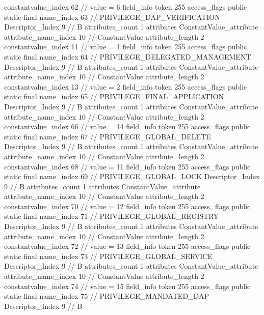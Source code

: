 {{{{{{{					constantvalue_index	62		// value = 6
				}
				}
			}
			field_info {
				token	255
				access_flags	public static final
				name_index	63		// PRIVILEGE_DAP_VERIFICATION
				Descriptor_Index	9		// B
				attributes_count	1
				attributes {
				ConstantValue_attribute {
					attribute_name_index	10		// ConstantValue
					attribute_length	2
					constantvalue_index	11		// value = 1
				}
				}
			}
			field_info {
				token	255
				access_flags	public static final
				name_index	64		// PRIVILEGE_DELEGATED_MANAGEMENT
				Descriptor_Index	9		// B
				attributes_count	1
				attributes {
				ConstantValue_attribute {
					attribute_name_index	10		// ConstantValue
					attribute_length	2
					constantvalue_index	13		// value = 2
				}
				}
			}
			field_info {
				token	255
				access_flags	public static final
				name_index	65		// PRIVILEGE_FINAL_APPLICATION
				Descriptor_Index	9		// B
				attributes_count	1
				attributes {
				ConstantValue_attribute {
					attribute_name_index	10		// ConstantValue
					attribute_length	2
					constantvalue_index	66		// value = 14
				}
				}
			}
			field_info {
				token	255
				access_flags	public static final
				name_index	67		// PRIVILEGE_GLOBAL_DELETE
				Descriptor_Index	9		// B
				attributes_count	1
				attributes {
				ConstantValue_attribute {
					attribute_name_index	10		// ConstantValue
					attribute_length	2
					constantvalue_index	68		// value = 11
				}
				}
			}
			field_info {
				token	255
				access_flags	public static final
				name_index	69		// PRIVILEGE_GLOBAL_LOCK
				Descriptor_Index	9		// B
				attributes_count	1
				attributes {
				ConstantValue_attribute {
					attribute_name_index	10		// ConstantValue
					attribute_length	2
					constantvalue_index	70		// value = 12
				}
				}
			}
			field_info {
				token	255
				access_flags	public static final
				name_index	71		// PRIVILEGE_GLOBAL_REGISTRY
				Descriptor_Index	9		// B
				attributes_count	1
				attributes {
				ConstantValue_attribute {
					attribute_name_index	10		// ConstantValue
					attribute_length	2
					constantvalue_index	72		// value = 13
				}
				}
			}
			field_info {
				token	255
				access_flags	public static final
				name_index	73		// PRIVILEGE_GLOBAL_SERVICE
				Descriptor_Index	9		// B
				attributes_count	1
				attributes {
				ConstantValue_attribute {
					attribute_name_index	10		// ConstantValue
					attribute_length	2
					constantvalue_index	74		// value = 15
				}
				}
			}
			field_info {
				token	255
				access_flags	public static final
				name_index	75		// PRIVILEGE_MANDATED_DAP
				Descriptor_Index	9		// B
}}}}}
